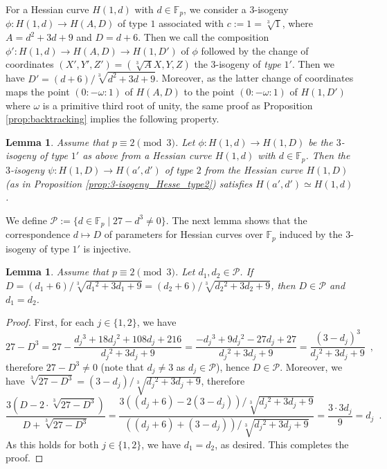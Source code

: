 \documentclass{article}
\newtheorem{lemma}[theorem]{Lemma}
\theoremstyle{definition}
\newcommand{\FF}{\mathbb{F}}
\begin{document}
For a Hessian curve $H(1,d)$ with $d \in \FF_p$, we consider a $3$-isogeny $\phi \colon H(1,d) \to H(A,D)$ of type $1$ associated with $c := 1 = \sqrt[3]{1}$, where $A = d^2 + 3d + 9$ and $D = d + 6$.
Then we call the composition $\phi' \colon H(1,d) \to H(A,D) \to H(1,D')$ of $\phi$ followed by the change of coordinates $(X',Y',Z') = (\sqrt[3]{A}X,Y,Z)$ the $3$-isogeny of \emph{type $1'$}.
Then we have $D' = (d + 6) / \sqrt[3]{d^2 + 3d + 9}$.
Moreover, as the latter change of coordinates maps the point $(0:-\omega:1)$ of $H(A,D)$ to the point $(0:-\omega:1)$ of $H(1,D')$ where $\omega$ is a primitive third root of unity, the same proof as Proposition \ref{prop:backtracking} implies the following property.

\begin{lemma}
\label{lem:backtracking_type1'}
Assume that $p \equiv 2 \pmod{3}$.
Let $\phi \colon H(1,d) \to H(1,D)$ be the $3$-isogeny of type $1'$ as above from a Hessian curve $H(1,d)$ with $d \in \FF_p$.
Then the $3$-isogeny $\psi \colon H(1,D) \to H(a',d')$ of type $2$ from the Hessian curve $H(1,D)$ (as in Proposition \ref{prop:3-isogeny_Hesse_type2}) satisfies $H(a',d') \simeq H(1,d)$.
\end{lemma}

We define $\mathcal{P} := \{ d \in \FF_p \mid 27 - d^3 \neq 0 \}$.
The next lemma shows that the correspondence $d \mapsto D$ of parameters for Hessian curves over $\FF_p$ induced by the $3$-isogeny of type $1'$ is injective.

\begin{lemma}
\label{lem:type1'_parameter_injective}
Assume that $p \equiv 2 \pmod{3}$.
Let $d_1,d_2 \in \mathcal{P}$.
If $D = (d_1 + 6) / \sqrt[3]{d_1{}^2 + 3d_1 + 9} = (d_2 + 6) / \sqrt[3]{d_2{}^2 + 3d_2 + 9}$, then $D \in \mathcal{P}$ and $d_1 = d_2$.
\end{lemma}
\begin{proof}
First, for each $j \in \{1,2\}$, we have
\[
27 - D^3
= 27 - \frac{ d_j{}^3 + 18 d_j{}^2 + 108 d_j + 216 }{ d_j{}^2 + 3 d_j + 9 }
= \frac{ - d_j{}^3 + 9 d_j{}^2 - 27 d_j + 27 }{ d_j{}^2 + 3 d_j + 9 }
= \frac{ (3 - d_j)^3 }{ d_j{}^2 + 3 d_j + 9 } \enspace,
\]
therefore $27 - D^3 \neq 0$ (note that $d_j \neq 3$ as $d_j \in \mathcal{P}$), hence $D \in \mathcal{P}$.
Moreover, we have $\sqrt[3]{27 - D^3} = (3 - d_j) / \sqrt[3]{ d_j{}^2 + 3 d_j + 9 }$, therefore
\[
\frac{ 3 ( D - 2 \cdot \sqrt[3]{27 - D^3} ) }{ D + \sqrt[3]{27 - D^3} }
= \frac{ 3 ( (d_j + 6) - 2 (3 - d_j) ) / \sqrt[3]{ d_j{}^2 + 3 d_j + 9 } }{ ( (d_j + 6) + (3 - d_j) ) / \sqrt[3]{ d_j{}^2 + 3 d_j + 9 }}
= \frac{ 3 \cdot 3 d_j }{ 9 }
= d_j \enspace.
\]
As this holds for both $j \in \{1,2\}$, we have $d_1 = d_2$, as desired.
This completes the proof.
\end{proof}
\end{document}
